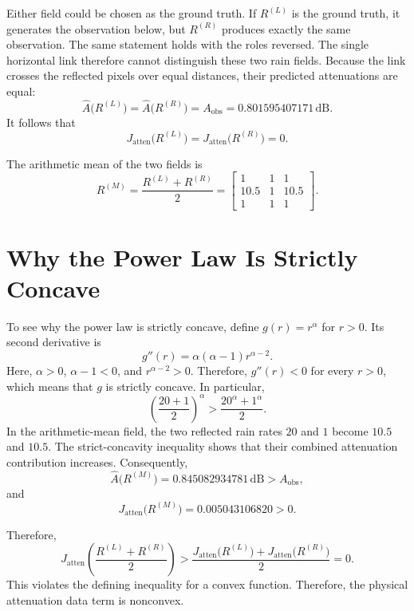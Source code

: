 \documentclass[11pt]{article}
\begin{document}
Either field could be chosen as the ground truth. If $R^{(L)}$ is the ground
truth, it generates the observation below, but $R^{(R)}$ produces exactly the
same observation. The same statement holds with the roles reversed. The
single horizontal link therefore cannot distinguish these two rain fields.
Because the link crosses the reflected pixels over equal distances, their
predicted attenuations are equal:
\begin{equation}
    \widehat{A}\bigl(R^{(L)}\bigr)
    = \widehat{A}\bigl(R^{(R)}\bigr)
    = A_{\mathrm{obs}}
    = 0.801595407171\,\mathrm{dB}.
\end{equation}
It follows that
\begin{equation}
    J_{\mathrm{atten}}\bigl(R^{(L)}\bigr)
    = J_{\mathrm{atten}}\bigl(R^{(R)}\bigr)
    = 0.
\end{equation}

The arithmetic mean of the two fields is
\begin{equation}
    R^{(M)}
    = \frac{R^{(L)}+R^{(R)}}{2}
    =
    \begin{bmatrix}
        1 & 1 & 1 \\
        10.5 & 1 & 10.5 \\
        1 & 1 & 1
    \end{bmatrix}.
\end{equation}

\section{Why the Power Law Is Strictly Concave}

To see why the power law is strictly concave, define $g(r)=r^\alpha$ for
$r>0$. Its second derivative is
\begin{equation}
    g''(r)=\alpha(\alpha-1)r^{\alpha-2}.
\end{equation}
Here, $\alpha>0$, $\alpha-1<0$, and $r^{\alpha-2}>0$. Therefore,
$g''(r)<0$ for every $r>0$, which means that $g$ is strictly concave. In
particular,
\begin{equation}
    \left(\frac{20+1}{2}\right)^\alpha
    > \frac{20^\alpha+1^\alpha}{2}.
\end{equation}
In the arithmetic-mean field, the two reflected rain rates $20$ and $1$
become $10.5$ and $10.5$. The strict-concavity inequality shows that their
combined attenuation contribution increases. Consequently,
\begin{equation}
    \widehat{A}\bigl(R^{(M)}\bigr)
    = 0.845082934781\,\mathrm{dB}
    > A_{\mathrm{obs}},
\end{equation}
and
\begin{equation}
    J_{\mathrm{atten}}\bigl(R^{(M)}\bigr)
    = 0.005043106820
    > 0.
\end{equation}

Therefore,
\begin{equation}
    J_{\mathrm{atten}}\!\left(
        \frac{R^{(L)}+R^{(R)}}{2}
    \right)
    >
    \frac{
        J_{\mathrm{atten}}\bigl(R^{(L)}\bigr)
        + J_{\mathrm{atten}}\bigl(R^{(R)}\bigr)
    }{2}
    = 0.
\end{equation}
This violates the defining inequality for a convex function. Therefore, the
physical attenuation data term is nonconvex.
\end{document}

